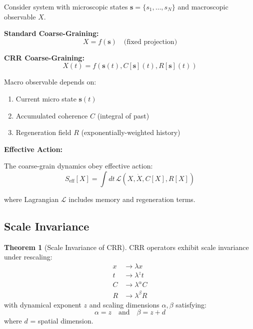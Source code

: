 \documentclass[11pt,a4paper]{article}
\theoremstyle{definition}
\newtheorem{theorem}{Theorem}[section]
\theoremstyle{remark}
\begin{document}
Consider system with microscopic states $\mathbf{s} = \{s_1, \ldots, s_N\}$ and macroscopic observable $X$.

\textbf{Standard Coarse-Graining:}
\begin{equation}
X = f(\mathbf{s}) \quad \text{(fixed projection)}
\end{equation}

\textbf{CRR Coarse-Graining:}
\begin{equation}
X(t) = f(\mathbf{s}(t), C[\mathbf{s}](t), R[\mathbf{s}](t))
\end{equation}

Macro observable depends on:
\begin{enumerate}
\item Current micro state $\mathbf{s}(t)$
\item Accumulated coherence $C$ (integral of past)
\item Regeneration field $R$ (exponentially-weighted history)
\end{enumerate}

\textbf{Effective Action:}

The coarse-grain dynamics obey effective action:
\begin{equation}
S_{\text{eff}}[X] = \int dt\, \mathcal{L}(X, \dot{X}, C[X], R[X])
\end{equation}

where Lagrangian $\mathcal{L}$ includes memory and regeneration terms.

\subsection{Scale Invariance}

\begin{theorem}[Scale Invariance of CRR]
CRR operators exhibit scale invariance under rescaling:
\begin{equation}
\begin{aligned}
x &\to \lambda x \\
t &\to \lambda^z t \\
C &\to \lambda^{\alpha} C \\
R &\to \lambda^{\beta} R
\end{aligned}
\end{equation}
with dynamical exponent $z$ and scaling dimensions $\alpha, \beta$ satisfying:
\begin{equation}
\alpha = z \quad \text{and} \quad \beta = z + d
\end{equation}
where $d$ = spatial dimension.
\end{theorem}
\end{document}
